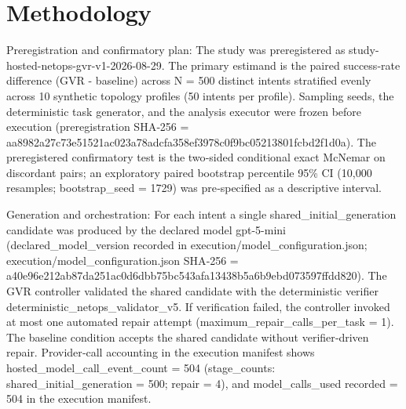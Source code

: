 \documentclass[conference]{IEEEtran}
\begin{document}
\section{Methodology}
Preregistration and confirmatory plan: The study was preregistered as study-hosted-netops-gvr-v1-2026-08-29. The primary estimand is the paired success‑rate difference (GVR - baseline) across N = 500 distinct intents stratified evenly across 10 synthetic topology profiles (50 intents per profile). Sampling seeds, the deterministic task generator, and the analysis executor were frozen before execution (preregistration SHA‑256 = aa8982a2\allowbreak{}7c73e515\allowbreak{}21ac023a\allowbreak{}78adcfa3\allowbreak{}58ef3978\allowbreak{}c0f9bc05\allowbreak{}213801fc\allowbreak{}bd2f1d0a). The preregistered confirmatory test is the two‑sided conditional exact McNemar on discordant pairs; an exploratory paired bootstrap percentile 95\% CI (10,000 resamples; bootstrap\_seed = 1729) was pre‑specified as a descriptive interval.

Generation and orchestration: For each intent a single shared\_initial\_generation candidate was produced by the declared model gpt-5-mini (declared\_model\_version recorded in execution/model\_configuration.json; execution/model\_configuration.json SHA‑256 = a40e96e2\allowbreak{}12ab87da\allowbreak{}251ac0d6\allowbreak{}dbb75bc5\allowbreak{}43afa134\allowbreak{}38b5a6b9\allowbreak{}ebd07359\allowbreak{}7ffdd820). The GVR controller validated the shared candidate with the deterministic verifier deterministic\_netops\_validator\_v5. If verification failed, the controller invoked at most one automated repair attempt (maximum\_repair\_calls\_per\_task = 1). The baseline condition accepts the shared candidate without verifier‑driven repair. Provider‑call accounting in the execution manifest shows hosted\_model\_call\_event\_count = 504 (stage\_counts: shared\_initial\_generation = 500; repair = 4), and model\_calls\_used recorded = 504 in the execution manifest.
\end{document}
